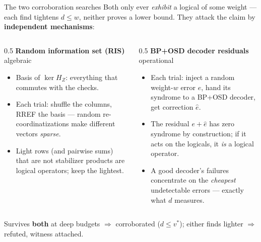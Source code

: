\documentclass[11pt,aspectratio=169]{beamer}
\begin{document}
\begin{frame}{The two corroboration searches}
  Both only ever \emph{exhibit} a logical of some weight --- each find tightens
  $d \le w$, neither proves a lower bound. They attack the claim by
  \textbf{independent mechanisms}:
  \smallskip
  \begin{columns}[T]
    \begin{column}{0.5\textwidth}
      \textbf{Random information set (RIS)} \hfill {\color{muted}\scriptsize algebraic}
      \begin{itemize}\setlength{\itemsep}{4pt}\small
        \item Basis of $\ker H_Z$: everything that commutes with the checks.
        \item Each trial: shuffle the columns, RREF the basis --- random
              re-coordinatizations make different vectors \emph{sparse}.
        \item Light rows (and pairwise sums) that are not stabilizer products
              are logical operators; keep the lightest.
      \end{itemize}
    \end{column}
    \begin{column}{0.5\textwidth}
      \textbf{BP+OSD decoder residuals} \hfill {\color{muted}\scriptsize operational}
      \begin{itemize}\setlength{\itemsep}{4pt}\small
        \item Each trial: inject a random weight-$w$ error $e$, hand its
              syndrome to a BP+OSD decoder, get correction $\hat e$.
        \item The residual $e + \hat e$ has zero syndrome by construction;
              if it acts on the logicals, it \emph{is} a logical operator.
        \item A good decoder's failures concentrate on the \emph{cheapest}
              undetectable errors --- exactly what $d$ measures.
      \end{itemize}
    \end{column}
  \end{columns}
  \medskip
  \begin{block}{}
    \small Survives \textbf{both} at deep budgets $\Rightarrow$ corroborated
    ($d \le v^{*}$); either finds lighter $\Rightarrow$
    \textcolor{flag}{refuted}, witness attached.
  \end{block}
\end{frame}

\end{document}
